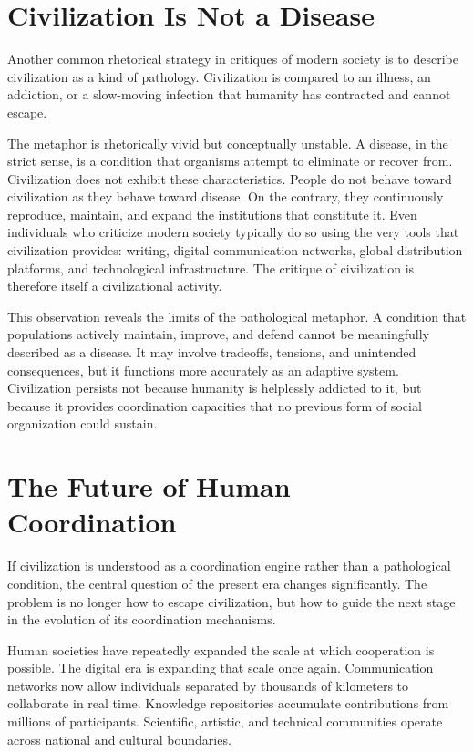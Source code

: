 \documentclass[12pt]{article}
\begin{document}
\section{Civilization Is Not a Disease}

Another common rhetorical strategy in critiques of modern society is to describe civilization as a kind of pathology. Civilization is compared to an illness, an addiction, or a slow-moving infection that humanity has contracted and cannot escape.

The metaphor is rhetorically vivid but conceptually unstable. A disease, in the strict sense, is a condition that organisms attempt to eliminate or recover from. Civilization does not exhibit these characteristics. People do not behave toward civilization as they behave toward disease. On the contrary, they continuously reproduce, maintain, and expand the institutions that constitute it. Even individuals who criticize modern society typically do so using the very tools that civilization provides: writing, digital communication networks, global distribution platforms, and technological infrastructure. The critique of civilization is therefore itself a civilizational activity.

This observation reveals the limits of the pathological metaphor. A condition that populations actively maintain, improve, and defend cannot be meaningfully described as a disease. It may involve tradeoffs, tensions, and unintended consequences, but it functions more accurately as an adaptive system. Civilization persists not because humanity is helplessly addicted to it, but because it provides coordination capacities that no previous form of social organization could sustain.

\section{The Future of Human Coordination}

If civilization is understood as a coordination engine rather than a pathological condition, the central question of the present era changes significantly. The problem is no longer how to escape civilization, but how to guide the next stage in the evolution of its coordination mechanisms.

Human societies have repeatedly expanded the scale at which cooperation is possible. The digital era is expanding that scale once again. Communication networks now allow individuals separated by thousands of kilometers to collaborate in real time. Knowledge repositories accumulate contributions from millions of participants. Scientific, artistic, and technical communities operate across national and cultural boundaries.
\end{document}
